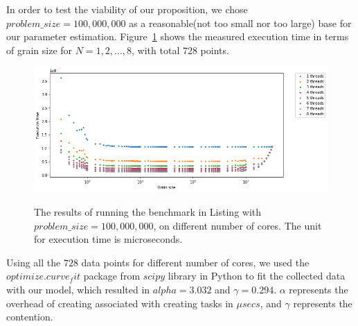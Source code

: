 In order to test the viability of our proposition, we chose $problem\_{size}=100,000,000$ as a reasonable(not too small nor too large) base for our parameter estimation. Figure~\ref{fig42} shows the measured execution time in terms of grain size for $N=1,2,...,8$, with total $728$ points.
 
\begin{figure}[H]
	\centering
	{\includegraphics[scale=.45]{images/hpx_for_loop/100000000_8.png}}
	\caption{The results of running the benchmark in Listing with $problem\_size=100,000,000$, on different number of cores. The unit for execution time is microseconds.}\label{fig42}		
\end{figure}

Using all the $728$ data points for different number of cores, we used the $optimize.curve_fit$ package from $scipy$ library in Python to fit the collected data with our model, which resulted in $alpha=3.032$ and $\gamma=0.294$. $\alpha$ represents the overhead of creating associated with creating tasks in $\mu{secs}$, and $\gamma$ represents the contention.

